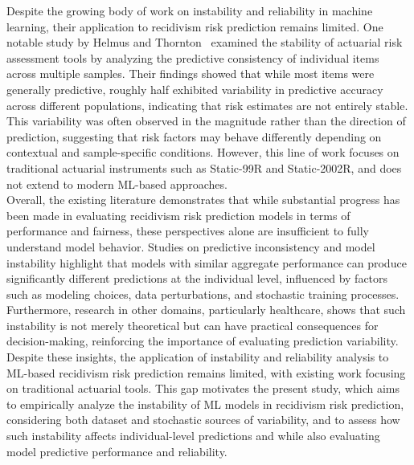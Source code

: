 \documentclass[12pt]{article}
\begin{document}
Despite the growing body of work on instability and reliability in machine learning, their application to recidivism risk prediction remains limited. One notable study by Helmus and Thornton~\cite{helmus2015stability} examined the stability of actuarial risk assessment tools by analyzing the predictive consistency of individual items across multiple samples. Their findings showed that while most items were generally predictive, roughly half exhibited variability in predictive accuracy across different populations, indicating that risk estimates are not entirely stable. This variability was often observed in the magnitude rather than the direction of prediction, suggesting that risk factors may behave differently depending on contextual and sample-specific conditions. However, this line of work focuses on traditional actuarial instruments such as Static-99R and Static-2002R, and does not extend to modern ML-based approaches.\\

Overall, the existing literature demonstrates that while substantial progress has been made in evaluating recidivism risk prediction models in terms of performance and fairness, these perspectives alone are insufficient to fully understand model behavior. Studies on predictive inconsistency and model instability highlight that models with similar aggregate performance can produce significantly different predictions at the individual level, influenced by factors such as modeling choices, data perturbations, and stochastic training processes. Furthermore, research in other domains, particularly healthcare, shows that such instability is not merely theoretical but can have practical consequences for decision-making, reinforcing the importance of evaluating prediction variability. Despite these insights, the application of instability and reliability analysis to ML-based recidivism risk prediction remains limited, with existing work focusing  on traditional actuarial tools. This gap motivates the present study, which aims to empirically analyze the instability of ML models in recidivism risk prediction, considering both dataset and stochastic sources of variability, and to assess how such instability affects individual-level predictions and while also evaluating model predictive performance and reliability.

\end{document}
